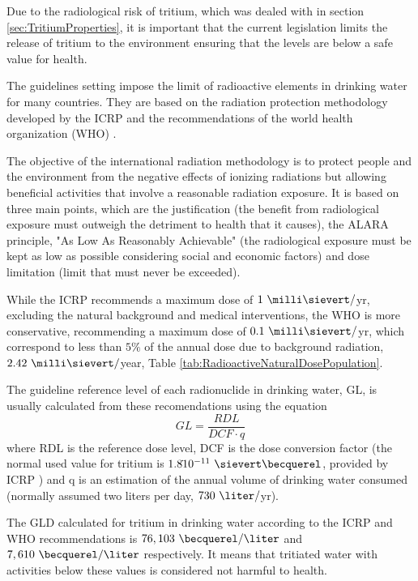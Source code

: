 Due to the radiological risk of tritium, which was dealed with in section \ref{sec:TritiumProperties}, it is important that the current legislation limits the release of tritium to the environment ensuring that the levels are below a safe value for health.

The guidelines setting impose the limit of radioactive elements in drinking water for many countries. They are based on the radiation protection methodology developed by the ICRP \cite{ICRP_GL} and the recommendations of the world health organization (WHO) \cite{WHO_GL}.

The objective of the international radiation methodology is to  protect people and the environment from the negative effects of ionizing radiations but allowing beneficial activities that involve a reasonable radiation exposure. It is based on three main points, which are the justification (the benefit from radiological exposure must outweigh the detriment to health that it causes), the ALARA principle, "As Low As Reasonably Achievable" (the radiological exposure must be kept as low as possible considering social and economic factors) and dose limitation (limit that must never be exceeded).

While the ICRP recommends a maximum dose of $1~\milli\sievert/$yr, excluding the natural background and medical interventions, the WHO is more conservative, recommending a maximum dose of $0.1~\milli\sievert/$yr, which correspond to less than $5\%$ of the annual dose due to background radiation, $2.42~\milli\sievert/$year, Table \ref{tab:RadioactiveNaturalDosePopulation}.

The guideline reference level of each radionuclide in drinking water, GL, is usually calculated from these recomendations using the equation
\begin{equation}
GL = \frac{RDL}{DCF \cdot{} q}
\label{eq:Guideline}
\end{equation}
where RDL is the reference dose level, DCF is the dose conversion factor (the normal used value for tritium is $1.8 \dot{} 10^{-11}~\sievert\becquerel$, provided by ICRP \cite{ICRP_factor}) and q is an estimation of the annual volume of drinking water consumed (normally assumed two liters per day, $730~\liter/$yr).

The GLD calculated for tritium in drinking water according to the ICRP and WHO recommendations is $76,103~\becquerel/\liter$ and $7,610~\becquerel/\liter$  respectively. It means that tritiated water with activities below these values is considered not harmful to health.

